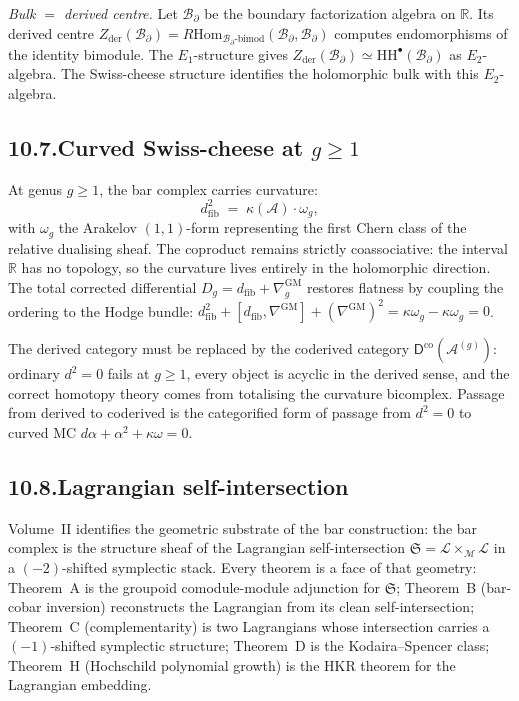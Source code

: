 \documentclass[11pt,reqno]{amsart}
\theoremstyle{definition}
\theoremstyle{remark}
\providecommand{\cA}{\mathcal{A}}
\providecommand{\cB}{\mathcal{B}}
\providecommand{\cL}{\mathcal{L}}
\providecommand{\cM}{\mathcal{M}}
\providecommand{\Hom}{\mathrm{Hom}}
\providecommand{\bR}{\mathbb{R}}
\providecommand{\HH}{\mathrm{HH}}
\providecommand{\der}{\mathrm{der}}
\providecommand{\GM}{\mathrm{GM}}
\providecommand{\co}{\mathrm{co}}
\numberwithin{equation}{section}
\begin{document}
\medskip\noindent\emph{Bulk $=$ derived centre.} Let
$\cB_\partial$ be the boundary factorization algebra on $\bR$.
Its derived centre
$Z_{\der}(\cB_\partial) = R\Hom_{\cB_\partial\text{-bimod}}
(\cB_\partial, \cB_\partial)$
computes endomorphisms of the identity bimodule. The
$E_1$-structure gives
$Z_{\der}(\cB_\partial) \simeq \HH^\bullet(\cB_\partial)$ as
$E_2$-algebra. The Swiss-cheese structure identifies the
holomorphic bulk with this $E_2$-algebra.

\subsection*{10.7.\enspace Curved Swiss-cheese at $g \ge 1$}

At genus $g \ge 1$, the bar complex carries curvature:
\[
d_{\mathrm{fib}}^2 \;=\; \kappa(\cA)\cdot\omega_g,
\]
with $\omega_g$ the Arakelov $(1,1)$-form representing the first
Chern class of the relative dualising sheaf. The coproduct
remains strictly coassociative: the interval $\bR$ has no
topology, so the curvature lives entirely in the holomorphic
direction. The total corrected differential
$D_g = d_{\mathrm{fib}} + \nabla^{\GM}_g$ restores flatness by
coupling the ordering to the Hodge bundle:
$d_{\mathrm{fib}}^2 + [d_{\mathrm{fib}}, \nabla^{\GM}]
+ (\nabla^{\GM})^2 = \kappa\omega_g - \kappa\omega_g = 0$.

The derived category must be replaced by the coderived category
$\mathsf D^{\co}(\cA^{(g)})$: ordinary $d^2 = 0$ fails at $g \ge
1$, every object is acyclic in the derived sense, and the
correct homotopy theory comes from totalising the curvature
bicomplex. Passage from derived to coderived is the categorified
form of passage from $d^2 = 0$ to curved MC
$d\alpha + \alpha^2 + \kappa\omega = 0$.

\subsection*{10.8.\enspace Lagrangian self-intersection}

Volume~II identifies the geometric substrate of the bar
construction: the bar complex is the structure sheaf of the
Lagrangian self-intersection
$\mathfrak S = \cL \times_\cM \cL$ in a $(-2)$-shifted
symplectic stack. Every theorem is a face of that geometry:
Theorem~A is the groupoid comodule-module adjunction for
$\mathfrak S$; Theorem~B (bar-cobar inversion) reconstructs
the Lagrangian from its clean self-intersection; Theorem~C
(complementarity) is two Lagrangians whose intersection
carries a $(-1)$-shifted symplectic structure; Theorem~D is
the Kodaira--Spencer class; Theorem~H (Hochschild polynomial
growth) is the HKR theorem for the Lagrangian embedding.
\end{document}
